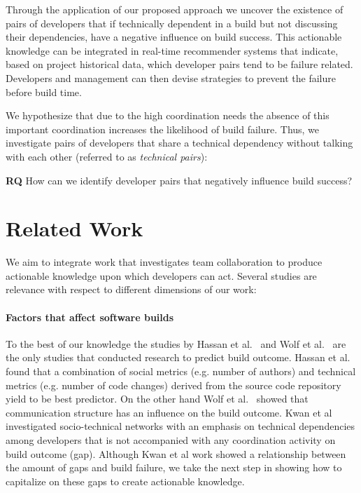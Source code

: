 \documentclass[conference]{IEEEtran}
\begin{document}
Through the application of our proposed approach we uncover the existence of pairs of
developers that if technically dependent in a build but not discussing their
dependencies, have a negative influence on build success. This
actionable knowledge can be integrated in real-time recommender systems that
indicate, based on project historical data, which developer pairs tend to be
failure related. Developers and management can then devise strategies to
prevent the failure before build time. 


We hypothesize that due to the high coordination needs the absence of this
important coordination increases the likelihood of build failure. 
Thus, we
investigate pairs of developers that share a technical dependency without talking
with each other (referred to as \emph{technical pairs}):

\textbf{RQ} How can we identify developer pairs that negatively influence build success?
 

\section{Related Work}
\label{sec:relwork}
We aim to integrate work that investigates team collaboration to produce actionable knowledge upon which developers can act.
Several studies are relevance with respect to different dimensions of our work:

\paragraph{Factors that affect software builds}
To the best of our knowledge the studies by Hassan et al.~\cite{hassan:ase:2006}
and Wolf et al.~\cite{wolf:icse:2009} are the only studies that conducted
research to predict build outcome. Hassan et al.~\cite{hassan:ase:2006} found
that a combination of social metrics (e.g. number of authors) and technical
metrics (e.g. number of code changes) derived from the source code repository
yield to be best predictor. 
On the other hand Wolf et al.~\cite{wolf:icse:2009} showed that communication structure has an influence on the build outcome.
Kwan et al~\cite{kwan:tse:2011} investigated socio-technical networks with an emphasis on technical dependencies among developers that is not accompanied with any coordination activity on build outcome (gap).
Although Kwan et al work showed a relationship between the amount of gaps and build failure, we take the next step in showing how to capitalize on these gaps to create actionable knowledge.
\end{document}
